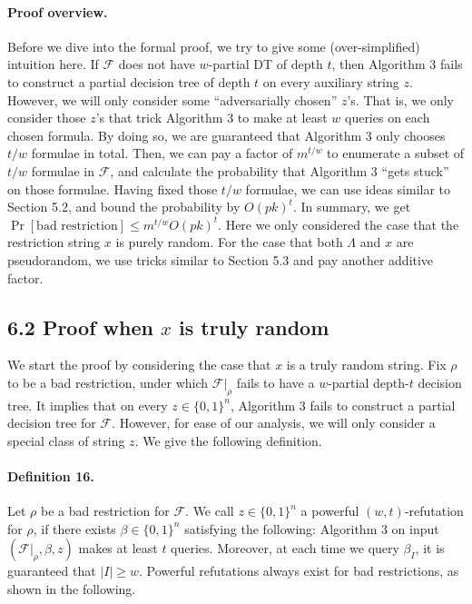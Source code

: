 \documentclass[10pt,a4paper]{article}
\begin{document}
\paragraph{Proof overview.} Before we dive into the formal proof, we try to give some (over-simplified) intuition here. If $\mathcal F$ does not have $w$-partial DT of depth $t$, then Algorithm 3 fails to construct a partial decision tree of depth $t$ on every auxiliary string $z$. However, we will only consider some ``adversarially chosen'' $z$'s. That is, we only consider those $z$'s that trick Algorithm 3 to make at least $w$ queries on each chosen formula. By doing so, we are guaranteed that Algorithm 3 only chooses $t/w$ formulae in total. Then, we can pay a factor of $m^{t/w}$ to enumerate a subset of $t/w$ formulae in $\mathcal F$, and calculate the probability that Algorithm 3 ``gets stuck'' on those formulae. Having fixed those $t/w$ formulae, we can use ideas similar to Section 5.2, and bound the probability by $O(pk)^t$. In summary, we get $\Pr[\text{bad restriction}]\le m^{t/w}O(pk)^t$. Here we only considered the case that the restriction string $x$ is purely random. For the case that both $\Lambda$ and $x$ are pseudorandom, we use tricks similar to Section 5.3 and pay another additive factor.
\subsection*{6.2 Proof when $x$ is truly random}
We start the proof by considering the case that $x$ is a truly random string. Fix $\rho$ to be a bad restriction, under which $\mathcal F|_\rho$ fails to have a $w$-partial depth-$t$ decision tree. It implies that on every $z\in\{0,1\}^n$, Algorithm 3 fails to construct a partial decision tree for $\mathcal F$. However, for ease of our analysis, we will only consider a special class of string $z$. We give the following definition.
\paragraph{Definition 16.} Let $\rho$ be a bad restriction for $\mathcal F$. We call $z\in\{0,1\}^n$ a powerful $(w,t)$-refutation for $\rho$, if there exists $\beta\in\{0,1\}^n$ satisfying the following: Algorithm 3 on input $(\mathcal F|_\rho,\beta,z)$ makes at least $t$ queries. Moreover, at each time we query $\beta_I$, it is guaranteed that $|I|\ge w$.
Powerful refutations always exist for bad restrictions, as shown in the following.
\end{document}
